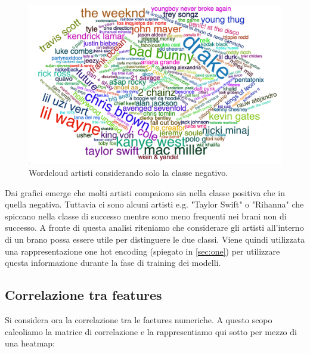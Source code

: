 \begin{figure}[H]
	\centering
	\includegraphics[width=14cm]{../images/wordcloud_negative_fix.png}
	\caption{Wordcloud artisti considerando solo la classe negativo.}
\end{figure}

Dai grafici emerge che molti artisti compaiono sia nella classe
positiva che in quella negativa. Tuttavia ci sono alcuni artisti
e.g. "Taylor Swift" o "Rihanna" che spiccano nella classe di successo
mentre sono meno frequenti nei brani non di successo. A fronte di
questa analisi riteniamo che considerare gli artisti all'interno di un
brano possa essere utile per distinguere le due classi. Viene quindi
utilizzata una rappresentazione one hot encoding (spiegato in
\autoref{sec:one}) per utilizzare questa informazione durante la fase
di training dei modelli.


\subsection{Correlazione tra features}
\label{sec:correlazione}
Si considera ora la correlazione tra le faetures numeriche. A questo
scopo calcoliamo la matrice di correlazione e la rappresentiamo qui
sotto per mezzo di una heatmap:

